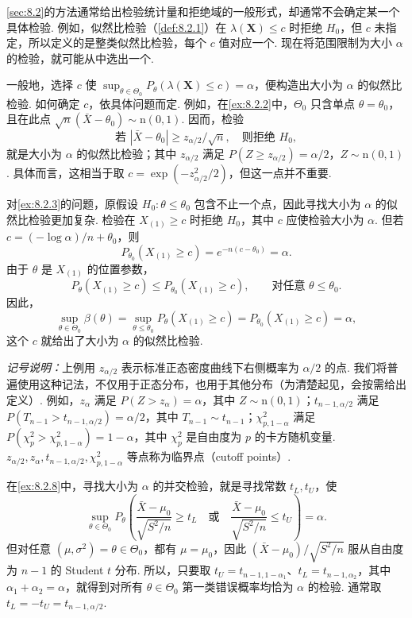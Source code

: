 \autoref{sec:8.2}的方法通常给出检验统计量和拒绝域的一般形式，却通常不会确定某一个具体检验. 例如，似然比检验（\autoref{def:8.2.1}）在 $\lambda(\boldsymbol X)\le c$ 时拒绝 $H_0$，但 $c$ 未指定，所以定义的是整类似然比检验，每个 $c$ 值对应一个. 现在将范围限制为大小 $\alpha$ 的检验，就可能从中选出一个.
\begin{example}[似然比检验的大小]\label{ex:8.3.7}
一般地，选择 $c$ 使 $\sup_{\theta\in\Theta_0}P_\theta(\lambda(\boldsymbol X)\le c)=\alpha$，便构造出大小为 $\alpha$ 的似然比检验. 如何确定 $c$，依具体问题而定. 例如，在\autoref{ex:8.2.2}中，$\Theta_0$ 只含单点 $\theta=\theta_0$，且在此点 $\sqrt n(\bar X-\theta_0)\sim\mathrm n(0,1)$. 因而，检验
$$\text{若 }|\bar X-\theta_0|\ge z_{\alpha/2}/\sqrt n,\quad\text{则拒绝 }H_0,$$
就是大小为 $\alpha$ 的似然比检验；其中 $z_{\alpha/2}$ 满足 $P(Z\ge z_{\alpha/2})=\alpha/2$，$Z\sim\mathrm n(0,1)$. 具体而言，这相当于取 $c=\exp(-z_{\alpha/2}^2/2)$，但这一点并不重要.

对\autoref{ex:8.2.3}的问题，原假设 $H_0:\theta\le\theta_0$ 包含不止一个点，因此寻找大小为 $\alpha$ 的似然比检验更加复杂. 检验在 $X_{(1)}\ge c$ 时拒绝 $H_0$，其中 $c$ 应使检验大小为 $\alpha$. 但若 $c=(-\log\alpha)/n+\theta_0$，则
$$P_{\theta_0}(X_{(1)}\ge c)=e^{-n(c-\theta_0)}=\alpha.$$
由于 $\theta$ 是 $X_{(1)}$ 的位置参数，
$$P_\theta(X_{(1)}\ge c)\le P_{\theta_0}(X_{(1)}\ge c),\qquad\text{对任意 }\theta\le\theta_0.$$
因此，
$$\sup_{\theta\in\Theta_0}\beta(\theta)=\sup_{\theta\le\theta_0}P_\theta(X_{(1)}\ge c)
=P_{\theta_0}(X_{(1)}\ge c)=\alpha,$$
这个 $c$ 就给出了大小为 $\alpha$ 的似然比检验.
\end{example}
\emph{记号说明：}上例用 $z_{\alpha/2}$ 表示标准正态密度曲线下右侧概率为 $\alpha/2$ 的点. 我们将普遍使用这种记法，不仅用于正态分布，也用于其他分布（为清楚起见，会按需给出定义\mbox{）.} 例如，$z_\alpha$ 满足 $P(Z>z_\alpha)=\alpha$，其中 $Z\sim\mathrm n(0,1)$；$t_{n-1,\alpha/2}$ 满足 $P(T_{n-1}>t_{n-1,\alpha/2})=\alpha/2$，其中 $T_{n-1}\sim t_{n-1}$；$\chi^2_{p,1-\alpha}$ 满足 $P(\chi_p^2>\chi^2_{p,1-\alpha})=1-\alpha$，其中 $\chi_p^2$ 是自由度为 $p$ 的卡方随机变量. $z_{\alpha/2},z_\alpha,t_{n-1,\alpha/2},\chi^2_{p,1-\alpha}$ 等点称为临界点（cutoff points\mbox{）.}
\begin{example}[并交检验的大小]\label{ex:8.3.8}
在\autoref{ex:8.2.8}中，寻找大小为 $\alpha$ 的并交检验，就是寻找常数 $t_L,t_U$，使
$$\sup_{\theta\in\Theta_0}P_\theta\left(\frac{\bar X-\mu_0}{\sqrt{S^2/n}}\ge t_L\quad\text{或}\quad\frac{\bar X-\mu_0}{\sqrt{S^2/n}}\le t_U\right)=\alpha.$$
但对任意 $(\mu,\sigma^2)=\theta\in\Theta_0$，都有 $\mu=\mu_0$，因此 $(\bar X-\mu_0)/\sqrt{S^2/n}$ 服从自由度为 $n-1$ 的 Student $t$ 分布. 所以，只要取 $t_U=t_{n-1,1-\alpha_1}$、$t_L=t_{n-1,\alpha_2}$，其中 $\alpha_1+\alpha_2=\alpha$，就得到对所有 $\theta\in\Theta_0$ 第一类错误概率均恰为 $\alpha$ 的检验. 通常取 $t_L=-t_U=t_{n-1,\alpha/2}$.
\end{example}
